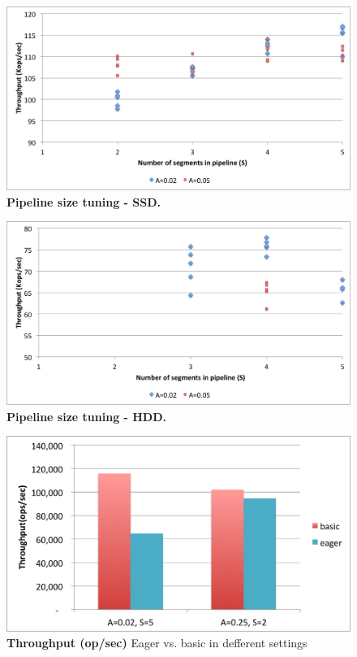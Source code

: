 \begin{figure}[htb]
\includegraphics[width=\figw]{Figs/pipeline-1-ssd.png}
\caption{{\bf Pipeline size tuning - SSD.} 
}
\label{fig:pipeline-1-ssd}
\end{figure}


\begin{figure}[htb]
\includegraphics[width=\figw]{Figs/pipeline-1-hdd.png}
\caption{{\bf Pipeline size tuning - HDD.} 
}
\label{fig:pipeline-1-hdd}
\end{figure}

\begin{figure}[htb]
\includegraphics[width=\figw]{Figs/eager-throughput.png}
\caption{{\bf Throughput (op/sec)} Eager vs. basic in defferent settings 
}
\label{fig:eager-throughput}
\end{figure}




